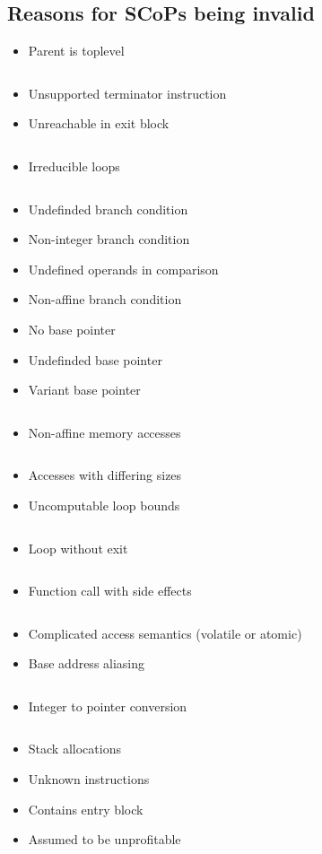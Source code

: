 \subsection{Reasons for SCoPs being invalid}
\begin{itemize}
    \item Parent is toplevel
        \inputminted{c++}{cpp/ParentIsTopLevelRegion.cpp}
    \item Unsupported terminator instruction
    \item Unreachable in exit block
        \inputminted{c++}{cpp/UnreachableInExitBlock.cpp}
    \item Irreducible loops
        \inputminted{c++}{cpp/IrreducibleRegion.cpp}
    \item Undefinded branch condition
    \item Non-integer branch condition
    \item Undefined operands in comparison
    \item Non-affine branch condition
    \item No base pointer
    \item Undefinded base pointer
    \item Variant base pointer
        \inputminted{c++}{cpp/VariantBasePointer.cpp}
    \item Non-affine memory accesses
        \inputminted{c++}{cpp/NonAffineMemoryAccesses.cpp}
    \item Accesses with differing sizes
    \item Uncomputable loop bounds
        \inputminted{c++}{cpp/UncomputableLoopBounds.cpp}
    \item Loop without exit
        \inputminted{c++}{cpp/LoopWithoutExit.cpp}
    \item Function call with side effects
        \inputminted{c++}{cpp/FunctionCall.cpp}
    \item Complicated access semantics (volatile or atomic)
    \item Base address aliasing
        \inputminted{c++}{cpp/BaseAddressAliasing.cpp}
    \item Integer to pointer conversion
        \inputminted{c++}{cpp/IntegerToPointerConversion.cpp}
    \item Stack allocations
    \item Unknown instructions
    \item Contains entry block
    \item Assumed to be unprofitable
        \inputminted{c++}{cpp/AssumedToBeUnprofitable.cpp}
\end{itemize}

